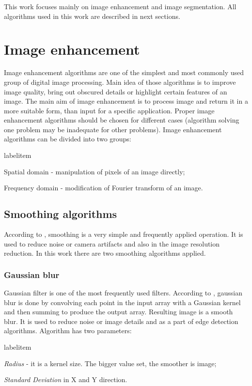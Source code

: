 \documentclass[a4paper,onecolumn,oneside,12pt]{memoir}
\makeatletter
\renewenvironment{itemize}{
  \begin{list}{  
  \csname labelitem\romannumeral\the\@listdepth\endcsname}{
  \setlength{\leftmargin}{1em}
	\setlength{\topsep}{6pt}%
	\setlength{\partopsep}{0pt}%
	\setlength{\parskip}{0pt}%
	\setlength{\parsep}{0pt}%
	\setlength{\itemsep}{0pt}}
}{
  \end{list}
}
\makeatother
\begin{document}
This work focuses mainly on image enhancement and image segmentation. All algorithms used in this 
work are described in next sections.

\section{Image enhancement}

Image enhancement algorithms are one of the simplest and most commonly used group of digital image
processing. Main idea of those algorithms is to improve image quality, bring out obscured details 
or highlight certain features of an image. The main aim of image enhancement is to process image 
and return it in a more suitable form, than input for a specific application. Proper image enhancement
algorithms should be chosen for different cases (algorithm solving one problem may be inadequate for
other problems). Image enhancement algorithms can be divided into two groups:

\begin{itemize}
  \item Spatial domain - manipulation of pixels of an image directly;
  \item Frequency domain - modification of Fourier transform of an image.
\end{itemize}

\subsection{Smoothing algorithms}

According to \cite{learningOpenCv}, smoothing is a very simple and frequently applied operation. It
is used to reduce noise or camera artifacts and also in the image resolution reduction. In this work
there are two smoothing algorithms applied.

\subsubsection{Gaussian blur}

Gaussian filter is one of the most frequently used filters. According to \cite{learningOpenCv}, 
gaussian blur is done by convolving each point in the input array with a Gaussian kernel and then
summing to produce the output array. Resulting image is a smooth blur. It is used to reduce noise
or image details and as a part of edge detection algorithms. Algorithm has two parameters:

\begin{itemize}
  \item \textit{Radius} - it is a kernel size. The bigger value set, the smoother is image;
  \item \textit{Standard Deviation} in X and Y direction.
\end{itemize}
\end{document}
